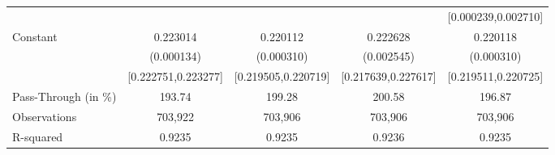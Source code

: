 {\begin{tabular}{l*{4}{c}}
                    &                     &                     &                     &[0.000239,0.002710]         \\
Constant            &    0.223014\sym{***}&    0.220112\sym{***}&    0.222628\sym{***}&    0.220118\sym{***}\\
                    &  (0.000134)         &  (0.000310)         &  (0.002545)         &  (0.000310)         \\
                    &[0.222751,0.223277]         &[0.219505,0.220719]         &[0.217639,0.227617]         &[0.219511,0.220725]         \\
\midrule
Pass-Through (in \%)&      193.74         &      199.28         &      200.58         &      196.87         \\
Observations        &     703,922         &     703,906         &     703,906         &     703,906         \\
R-squared           &      0.9235         &      0.9235         &      0.9236         &      0.9235         \\
\bottomrule
\end{tabular}
}
